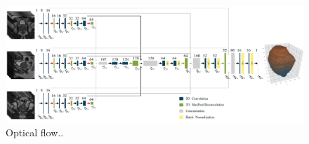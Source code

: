\begin{figure}[h]
    \centering
    \includegraphics[totalheight=.3\textheight]{imgs/methodology/NN.png}
    \caption{Optical flow..}
    \label{fig:nn}
\end{figure}
